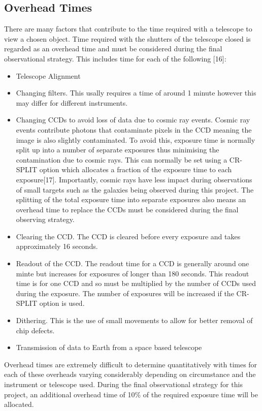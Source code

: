 \documentclass[pdf,color]{UoBnote}
\begin{document}
\subsection{Overhead Times}
There are many factors that contribute to the time required with a telescope to view a chosen object. Time required with the shutters of the telescope closed is regarded as an overhead time and must be considered during the final observational strategy. This includes time for each of the following [16]:
\begin{itemize}
\item Telescope Alignment
\item Changing filters. This usally requires a time of around 1 minute however this may differ for different instruments.   
\item Changing CCDs to avoid loss of data due to cosmic ray events. Cosmic ray events contribute photons that contaminate pixels in the CCD meaning the image is also slightly contaminated. To avoid this, exposure time is normally split up into a number of separate exposures thus minimising the contamination due to cosmic rays. This can normally be set using a CR-SPLIT option which allocates a fraction of the exposure time to each exposure[17]. Importantly, cosmic rays have less impact during observations of small targets such as the galaxies being observed during this project. The splitting of the total exposure time into separate exposures also means an overhead time to replace the CCDs must be considered during the final observing strategy. 
\item Clearing the CCD. The CCD is cleared before every exposure and takes approximately 16 seconds.
\item Readout of the CCD. The readout time for a CCD is generally around one minte but increases for exposures of longer than 180 seconds. This readout time is for one CCD and so must be multiplied by the number of CCDs used  during the exposure. The number of exposures will be increased if the CR-SPLIT option is used.
\item Dithering. This is the use of small movements to allow for better removal of chip defects.
\item Transmission of data to Earth from a space based telescope
\end{itemize}
\noindent
Overhead times are extremely difficult to determine quantitatively with times for each of these overheads varying considerably depending on circumstance and the instrument or telescope used. During the final observational strategy for this project, an additional overhead time of 10\% of the required exposure time will be allocated. \\
\end{document}
